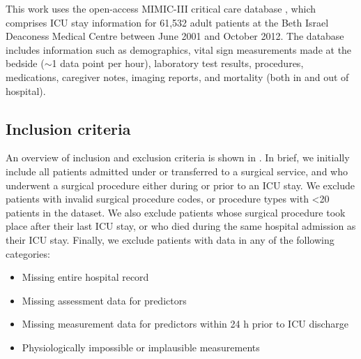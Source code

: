 \documentclass[onecolumn]{article}
\begin{document}
This work uses the open-access MIMIC-III critical care database \citep{Johnson2016}, which comprises ICU stay information for 61,532 adult patients at the Beth Israel Deaconess Medical Centre between June 2001 and October 2012. The database includes information such as demographics, vital sign measurements made at the bedside ($\sim$1 data point per hour), laboratory test results, procedures, medications, caregiver notes, imaging reports, and mortality (both in and out of hospital).

\subsection{Inclusion criteria}

An overview of inclusion and exclusion criteria is shown in . In brief, we initially include all patients admitted under or transferred to a surgical service, and who underwent a surgical procedure either during or prior to an ICU stay. We exclude patients with invalid surgical procedure codes, or procedure types with <20 patients in the dataset. We also exclude patients whose surgical procedure took place after their last ICU stay, or who died during the same hospital admission as their ICU stay. Finally, we exclude patients with data in any of the following categories:

\begin{itemize}
\item Missing entire hospital record
\item Missing assessment data for predictors
\item Missing measurement data for predictors within 24 h prior to ICU discharge
\item Physiologically impossible or implausible measurements
\end{itemize}
\end{document}
